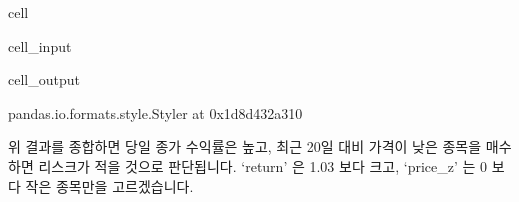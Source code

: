 \documentclass[letterpaper,10pt,english]{jupyterBook}
\begin{document}
\begin{sphinxuseclass}{cell}\begin{sphinxVerbatimInput}

\begin{sphinxuseclass}{cell_input}
\begin{sphinxVerbatim}[commandchars=\\\{\}]
             
\end{sphinxVerbatim}

\end{sphinxuseclass}\end{sphinxVerbatimInput}
\begin{sphinxVerbatimOutput}

\begin{sphinxuseclass}{cell_output}
\begin{sphinxVerbatim}[commandchars=\\\{\}]
\PYGZlt{}pandas.io.formats.style.Styler at 0x1d8d432a310\PYGZgt{}
\end{sphinxVerbatim}

\end{sphinxuseclass}\end{sphinxVerbatimOutput}

\end{sphinxuseclass}
\sphinxAtStartPar
 위 결과를 종합하면 당일 종가 수익률은 높고, 최근 20일 대비 가격이 낮은 종목을 매수하면 리스크가 적을 것으로 판단됩니다. ‘return’ 은 1.03 보다 크고, ‘price\_z’ 는 0 보다 작은 종목만을 고르겠습니다.
\end{document}
